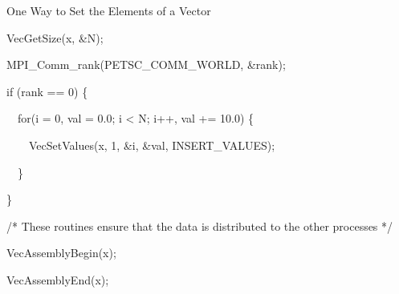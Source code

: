 \begin{frame}{One Way to Set the Elements of a Vector}

\begin{semiverbatim}
VecGetSize(x, \&N);

MPI\_Comm\_rank(PETSC\_COMM\_WORLD, \&rank);

if (rank == 0) \{

\ \ for(i = 0, val = 0.0; i < N; i++, val += 10.0) \{

\ \ \ \ VecSetValues(x, 1, \&i, \&val, INSERT\_VALUES);

\ \ \}

\}

/* These routines ensure that the data is distributed to the other processes */

VecAssemblyBegin(x);

VecAssemblyEnd(x);
\end{semiverbatim}
\end{frame}
